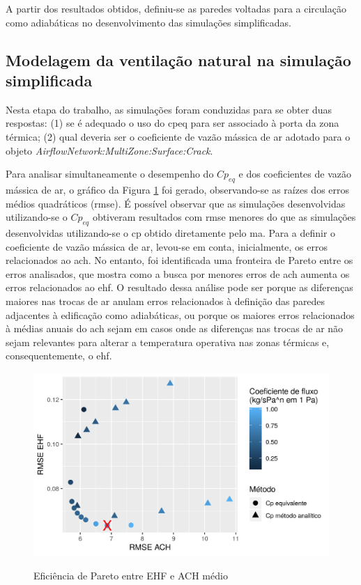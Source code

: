 \documentclass[brazil,hardcopy,openany]{ufscthesis} %
\begin{document}
A partir dos resultados obtidos, definiu-se as paredes voltadas para a circulação como adiabáticas no desenvolvimento das simulações simplificadas.

\subsection{Modelagem da ventilação natural na simulação simplificada}

Nesta etapa do trabalho, as simulações foram conduzidas para se obter duas respostas:
(1) se é adequado o uso do \acrfull{cpeq} para ser associado à porta da zona térmica; (2) qual deveria ser o coeficiente de vazão mássica de ar adotado para o objeto \textit{AirflowNetwork:MultiZone:Surface:Crack}.

Para analisar simultaneamente o desempenho do $Cp_{eq}$ e dos coeficientes de vazão mássica de ar, o gráfico da Figura \ref{fig:pareto} foi gerado, observando-se as raízes dos erros médios quadráticos (\acrshort{rmse}).
É possível observar que as simulações desenvolvidas utilizando-se o $Cp_{eq}$ obtiveram resultados com \acrshort{rmse} menores do que as simulações desenvolvidas utilizando-se o \acrshort{cp} obtido diretamente pelo \acrlong{ma}.
Para a definir o coeficiente de vazão mássica de ar, levou-se em conta, inicialmente, os erros relacionados ao \acrshort{ach}.
No entanto, foi identificada uma fronteira de Pareto entre os erros analisados, que mostra como a busca por menores erros de \acrshort{ach} aumenta os erros relacionados ao \acrshort{ehf}.
O resultado dessa análise pode ser porque as diferenças maiores nas trocas de ar anulam erros relacionados à definição das paredes adjacentes à edificação como adiabáticas, ou porque os maiores erros relacionados à médias anuais do \acrshort{ach} sejam em casos onde as diferenças nas trocas de ar não sejam relevantes para alterar a temperatura operativa nas zonas térmicas e, consequentemente, o \acrshort{ehf}.

\begin{figure}[h]
	\centering
	\caption{Eficiência de Pareto entre EHF e ACH médio}
	\includegraphics[width=1\linewidth]{img/cpeq_pareto.png}
	\label{fig:pareto}
\end{figure}
\end{document}
